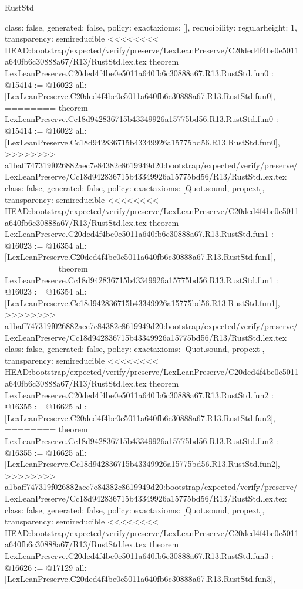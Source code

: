 \begin{lexlean}{RustStd}
\begin{coremodule}
{\begin{coremodule}
{{{  class: false,
  generated: false,
  policy: exact{axioms: []},
  reducibility: regular{height: 1},
  transparency: semireducible
}
<<<<<<<< HEAD:bootstrap/expected/verify/preserve/LexLeanPreserve/C20ded4f4be0e5011a640fb6c30888a67/R13/RustStd.lex.tex
theorem LexLeanPreserve.C20ded4f4be0e5011a640fb6c30888a67.R13.RustStd.fun0 : @15414 := @16022 {
  all: [LexLeanPreserve.C20ded4f4be0e5011a640fb6c30888a67.R13.RustStd.fun0],
========
theorem LexLeanPreserve.Cc18d942836715b43349926a15775bd56.R13.RustStd.fun0 : @15414 := @16022 {
  all: [LexLeanPreserve.Cc18d942836715b43349926a15775bd56.R13.RustStd.fun0],
>>>>>>>> a1baff747319f026882aec7e84382c8619949d20:bootstrap/expected/verify/preserve/LexLeanPreserve/Cc18d942836715b43349926a15775bd56/R13/RustStd.lex.tex
  class: false,
  generated: false,
  policy: exact{axioms: [Quot.sound, propext]},
  transparency: semireducible
}
<<<<<<<< HEAD:bootstrap/expected/verify/preserve/LexLeanPreserve/C20ded4f4be0e5011a640fb6c30888a67/R13/RustStd.lex.tex
theorem LexLeanPreserve.C20ded4f4be0e5011a640fb6c30888a67.R13.RustStd.fun1 : @16023 := @16354 {
  all: [LexLeanPreserve.C20ded4f4be0e5011a640fb6c30888a67.R13.RustStd.fun1],
========
theorem LexLeanPreserve.Cc18d942836715b43349926a15775bd56.R13.RustStd.fun1 : @16023 := @16354 {
  all: [LexLeanPreserve.Cc18d942836715b43349926a15775bd56.R13.RustStd.fun1],
>>>>>>>> a1baff747319f026882aec7e84382c8619949d20:bootstrap/expected/verify/preserve/LexLeanPreserve/Cc18d942836715b43349926a15775bd56/R13/RustStd.lex.tex
  class: false,
  generated: false,
  policy: exact{axioms: [Quot.sound, propext]},
  transparency: semireducible
}
<<<<<<<< HEAD:bootstrap/expected/verify/preserve/LexLeanPreserve/C20ded4f4be0e5011a640fb6c30888a67/R13/RustStd.lex.tex
theorem LexLeanPreserve.C20ded4f4be0e5011a640fb6c30888a67.R13.RustStd.fun2 : @16355 := @16625 {
  all: [LexLeanPreserve.C20ded4f4be0e5011a640fb6c30888a67.R13.RustStd.fun2],
========
theorem LexLeanPreserve.Cc18d942836715b43349926a15775bd56.R13.RustStd.fun2 : @16355 := @16625 {
  all: [LexLeanPreserve.Cc18d942836715b43349926a15775bd56.R13.RustStd.fun2],
>>>>>>>> a1baff747319f026882aec7e84382c8619949d20:bootstrap/expected/verify/preserve/LexLeanPreserve/Cc18d942836715b43349926a15775bd56/R13/RustStd.lex.tex
  class: false,
  generated: false,
  policy: exact{axioms: [Quot.sound, propext]},
  transparency: semireducible
}
<<<<<<<< HEAD:bootstrap/expected/verify/preserve/LexLeanPreserve/C20ded4f4be0e5011a640fb6c30888a67/R13/RustStd.lex.tex
theorem LexLeanPreserve.C20ded4f4be0e5011a640fb6c30888a67.R13.RustStd.fun3 : @16626 := @17129 {
  all: [LexLeanPreserve.C20ded4f4be0e5011a640fb6c30888a67.R13.RustStd.fun3],
}}}}}}
\end{coremodule}}
\end{coremodule}
\end{lexlean}
